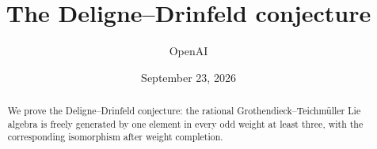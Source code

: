 \documentclass[11pt]{article}
\title{The Deligne--Drinfeld conjecture}
\author{OpenAI}
\date{September 23, 2026}
\begin{document}
\maketitle
\begin{abstract}
We prove the Deligne--Drinfeld conjecture: the rational Grothendieck--Teichm\"uller Lie algebra is freely generated by one element in every odd weight at least three, with the corresponding isomorphism after weight completion.
\end{abstract}
\tableofcontents









\end{document}

